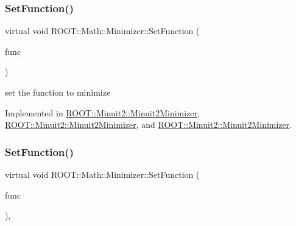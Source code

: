 \mbox{\label{classROOT_1_1Math_1_1Minimizer_a4391c613ab0c3f9777e56b487ffa5eac}} 
\subsubsection{\texorpdfstring{SetFunction()}{SetFunction()}\hspace{0.1cm}{\footnotesize\ttfamily [3/6]}}
{\footnotesize\ttfamily virtual void R\+O\+O\+T\+::\+Math\+::\+Minimizer\+::\+Set\+Function (\begin{DoxyParamCaption}\item[{const \mbox{\hyperlink{namespaceROOT_1_1Math_aec22897f3d759f7c284893c81d980799}{R\+O\+O\+T\+::\+Math\+::\+I\+Multi\+Gen\+Function}} \&}]{func }\end{DoxyParamCaption})\hspace{0.3cm}{\ttfamily [pure virtual]}}



set the function to minimize 



Implemented in \mbox{\hyperlink{classROOT_1_1Minuit2_1_1Minuit2Minimizer_ae18efc66a943fe11b1114ff8c1b28ad0}{R\+O\+O\+T\+::\+Minuit2\+::\+Minuit2\+Minimizer}}, \mbox{\hyperlink{classROOT_1_1Minuit2_1_1Minuit2Minimizer_ae18efc66a943fe11b1114ff8c1b28ad0}{R\+O\+O\+T\+::\+Minuit2\+::\+Minuit2\+Minimizer}}, and \mbox{\hyperlink{classROOT_1_1Minuit2_1_1Minuit2Minimizer_ae18efc66a943fe11b1114ff8c1b28ad0}{R\+O\+O\+T\+::\+Minuit2\+::\+Minuit2\+Minimizer}}.

\mbox{\label{classROOT_1_1Math_1_1Minimizer_a1d9ff15aa732e518a60a05dcbd82c34a}} 
\subsubsection{\texorpdfstring{SetFunction()}{SetFunction()}\hspace{0.1cm}{\footnotesize\ttfamily [4/6]}}
{\footnotesize\ttfamily virtual void R\+O\+O\+T\+::\+Math\+::\+Minimizer\+::\+Set\+Function (\begin{DoxyParamCaption}\item[{const \mbox{\hyperlink{namespaceROOT_1_1Math_a014e019aaf9304a00e9231bd9ed232fb}{R\+O\+O\+T\+::\+Math\+::\+I\+Multi\+Grad\+Function}} \&}]{func }\end{DoxyParamCaption})\hspace{0.3cm}{\ttfamily [inline]}, {\ttfamily [virtual]}}



